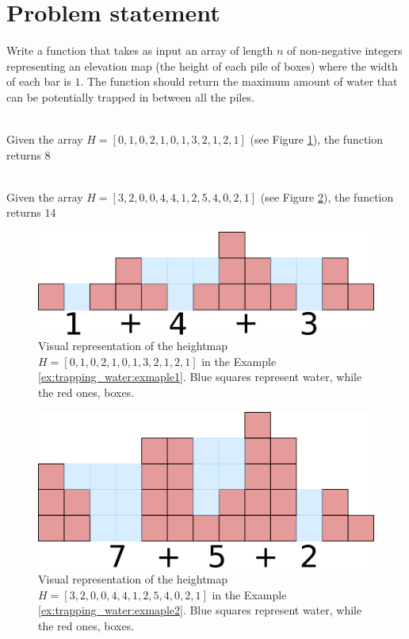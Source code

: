 \section{Problem statement}
\begin{exercise}
Write a function that takes as input an array of length $n$ of non-negative integers representing an elevation map (the height of each pile of boxes) where the width of each bar is $1$. 
The function should return the maximum amount of water that can be potentially trapped in between all the piles. 

	\begin{example}
		\label{ex:trapping_water:exmaple1}
		\hfill \\
		Given the array $H=[0,1,0,2,1,0,1,3,2,1,2,1]$ (see Figure \ref{fig:trapping_water_example1}), the function returns $8$
	\end{example}

	\begin{example}
		\label{ex:trapping_water:exmaple2}
		\hfill \\
		Given the array $H=[3,2,0,0,4,4,1,2,5,4,0,2,1]$ (see Figure \ref{fig:trapping_water_example2}), the function returns $14$
	\end{example}

\end{exercise}

\begin{figure}
	\centering
	\includegraphics[scale=1.0]{sources/trapping_water/images/example1}
	\caption{Visual representation of the heightmap $H=[0,1,0,2,1,0,1,3,2,1,2,1]$ in the Example \ref{ex:trapping_water:exmaple1}. Blue squares represent water, while the red ones, boxes.}
	\label{fig:trapping_water_example1}
\end{figure}



\begin{figure}
	\centering
	\includegraphics[scale=1.0]{sources/trapping_water/images/example2}
	\caption{Visual representation of the heightmap $H=[3,2,0,0,4,4,1,2,5,4,0,2,1]$ in the Example \ref{ex:trapping_water:exmaple2}. Blue squares represent water, while the red ones, boxes.}
	\label{fig:trapping_water_example2}
\end{figure}

